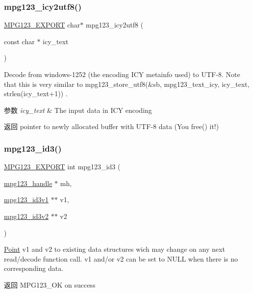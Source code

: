 \subsubsection{\texorpdfstring{mpg123\+\_\+icy2utf8()}{mpg123\_icy2utf8()}}
{\footnotesize\ttfamily \hyperlink{mpg123_8h_a2ba98cfba3f760879df70e755b2a61cc}{M\+P\+G123\+\_\+\+E\+X\+P\+O\+RT} char$\ast$ mpg123\+\_\+icy2utf8 (\begin{DoxyParamCaption}\item[{const char $\ast$}]{icy\+\_\+text }\end{DoxyParamCaption})}

Decode from windows-\/1252 (the encoding I\+CY metainfo used) to U\+T\+F-\/8. Note that this is very similar to mpg123\+\_\+store\+\_\+utf8(\&sb, mpg123\+\_\+text\+\_\+icy, icy\+\_\+text, strlen(icy\+\_\+text+1)) . 
\begin{DoxyParams}{参数}
{\em icy\+\_\+text} & The input data in I\+CY encoding \\
\hline
\end{DoxyParams}
\begin{DoxyReturn}{返回}
pointer to newly allocated buffer with U\+T\+F-\/8 data (You free() it!) 
\end{DoxyReturn}
\mbox{\label{group__mpg123__metadata_ga8352786015f8ff33c7d1fe8a4d979c88}} 
\subsubsection{\texorpdfstring{mpg123\+\_\+id3()}{mpg123\_id3()}}
{\footnotesize\ttfamily \hyperlink{mpg123_8h_a2ba98cfba3f760879df70e755b2a61cc}{M\+P\+G123\+\_\+\+E\+X\+P\+O\+RT} int mpg123\+\_\+id3 (\begin{DoxyParamCaption}\item[{\hyperlink{group__mpg123__init_ga6728e2839a395f3a07d4514da659faca}{mpg123\+\_\+handle} $\ast$}]{mh,  }\item[{\hyperlink{structmpg123__id3v1}{mpg123\+\_\+id3v1} $\ast$$\ast$}]{v1,  }\item[{\hyperlink{structmpg123__id3v2}{mpg123\+\_\+id3v2} $\ast$$\ast$}]{v2 }\end{DoxyParamCaption})}

\hyperlink{struct_point}{Point} v1 and v2 to existing data structures wich may change on any next read/decode function call. v1 and/or v2 can be set to N\+U\+LL when there is no corresponding data. \begin{DoxyReturn}{返回}
M\+P\+G123\+\_\+\+OK on success 
\end{DoxyReturn}
\mbox{\label{group__mpg123__metadata_gaf0206ccb2574f563bff863a26a3b0025}} 
